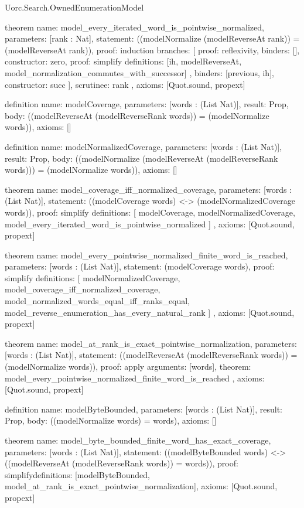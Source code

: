 \begin{lexlean}{Uorc.Search.OwnedEnumerationModel}
\begin{semanticmodule}
theorem{
  name: model_every_iterated_word_is_pointwise_normalized,
  parameters: [rank : Nat],
  statement: ((modelNormalize (modelReverseAt rank)) = (modelReverseAt rank)),
  proof: induction{
    branches: [
      {proof: reflexivity{}, binders: [], constructor: zero},
      {
        proof: simplify{
          definitions: [ih, modelReverseAt, model_normalization_commutes_with_successor]
        },
        binders: [previous, ih],
        constructor: succ
      }
    ],
    scrutinee: rank
  },
  axioms: [Quot.sound, propext]
}

definition{
  name: modelCoverage,
  parameters: [words : (List Nat)],
  result: Prop,
  body: ((modelReverseAt (modelReverseRank words)) = (modelNormalize words)),
  axioms: []
}

definition{
  name: modelNormalizedCoverage,
  parameters: [words : (List Nat)],
  result: Prop,
  body: ((modelNormalize (modelReverseAt (modelReverseRank words))) = (modelNormalize words)),
  axioms: []
}

theorem{
  name: model_coverage_iff_normalized_coverage,
  parameters: [words : (List Nat)],
  statement: ((modelCoverage words) <-> (modelNormalizedCoverage words)),
  proof: simplify{
    definitions: [
      modelCoverage,
      modelNormalizedCoverage,
      model_every_iterated_word_is_pointwise_normalized
    ]
  },
  axioms: [Quot.sound, propext]
}

theorem{
  name: model_every_pointwise_normalized_finite_word_is_reached,
  parameters: [words : (List Nat)],
  statement: (modelCoverage words),
  proof: simplify{
    definitions: [
      modelNormalizedCoverage,
      model_coverage_iff_normalized_coverage,
      model_normalized_words_equal_iff_ranks_equal,
      model_reverse_enumeration_has_every_natural_rank
    ]
  },
  axioms: [Quot.sound, propext]
}

theorem{
  name: model_at_rank_is_exact_pointwise_normalization,
  parameters: [words : (List Nat)],
  statement: ((modelReverseAt (modelReverseRank words)) = (modelNormalize words)),
  proof: apply{
    arguments: [words],
    theorem: model_every_pointwise_normalized_finite_word_is_reached
  },
  axioms: [Quot.sound, propext]
}

definition{
  name: modelByteBounded,
  parameters: [words : (List Nat)],
  result: Prop,
  body: ((modelNormalize words) = words),
  axioms: []
}

theorem{
  name: model_byte_bounded_finite_word_has_exact_coverage,
  parameters: [words : (List Nat)],
  statement: ((modelByteBounded words) <-> ((modelReverseAt (modelReverseRank words)) = words)),
  proof: simplify{definitions: [modelByteBounded, model_at_rank_is_exact_pointwise_normalization]},
  axioms: [Quot.sound, propext]
}


\end{semanticmodule}
\end{lexlean}
